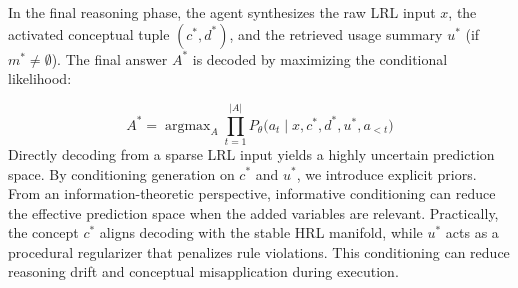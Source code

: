 \documentclass[11pt]{article}
\begin{document}


In the final reasoning phase, the agent synthesizes the raw LRL input $x$, the activated conceptual tuple $(c^*, d^*)$, and the retrieved usage summary $u^*$ (if $m^* \neq \emptyset$). 
The final answer $A^*$ is decoded by maximizing the conditional likelihood:

\begin{equation}
    A^* = \mathop{\arg\max}_{A} \prod_{t=1}^{|A|} P_\theta \big( a_t \mid x, c^*, d^*, u^*, a_{<t} \big)
\end{equation}
Directly decoding from a sparse LRL input yields a highly uncertain prediction space. 
By conditioning generation on $c^*$ and $u^*$, we introduce explicit priors.
From an information-theoretic perspective, informative conditioning can reduce the effective prediction space when the added variables are relevant.
Practically, the concept $c^*$ aligns decoding with the stable HRL manifold, while $u^*$ acts as a procedural regularizer that penalizes rule violations. 
This conditioning can reduce reasoning drift and conceptual misapplication during execution.

\end{document}
